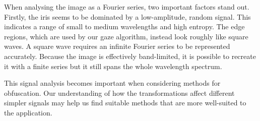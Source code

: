 When analysing the image as a Fourier series, two important factors stand out. Firstly, the iris seems to be dominated by a low-amplitude, random signal. This indicates a range of small to medium wavelengths and high entropy. The edge regions, which are used by our gaze algorithm, instead look roughly like square waves. A square wave requires an infinite Fourier series to be represented accurately. Because the image is effectively band-limited, it is possible to recreate it with a finite series but it still spans the whole wavelength spectrum.

This signal analysis becomes important when considering methods for obfuscation. Our understanding of how the transformations affect different simpler signals may help us find suitable methods that are more well-suited to the application.









